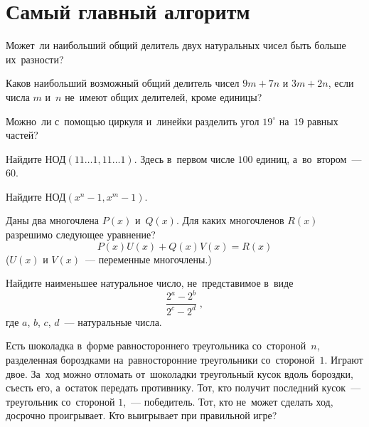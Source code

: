 
\section*{Самый главный алгоритм}


\begin{problems}

\item
Может~ли наибольший общий делитель двух натуральных чисел быть больше
их~разности?

\item
Каков наибольший возможный общий делитель чисел $9 m + 7 n$ и $3 m + 2 n$, если
числа $m$ и~$n$ не~имеют общих делителей, кроме единицы?

\item
Можно~ли с~помощью циркуля и~линейки разделить угол $19^\circ$ на~$19$ равных
частей?

\item
Найдите $\text{НОД}(11\ldots1, 11\ldots1)$.
Здесь в~первом числе $100$ единиц, а~во~втором~--- $60$.

\item
Найдите $\text{НОД}(x^{n} - 1, x^{m} - 1)$.

\item
Даны два многочлена $P(x)$ и~$Q(x)$.
Для каких многочленов $R(x)$ разрешимо следующее уравнение?
\[
    P(x) U(x) + Q(x) V(x) = R(x)
\]
($U(x)$ и $V(x)$~--- переменные многочлены.)

\item
Найдите наименьшее натуральное число, не~представимое в~виде
\[
    \frac{2^a - 2^b}{2^c - 2^d}
\; , \]
где $a$, $b$, $c$, $d$~--- натуральные числа.

\item
Есть шоколадка в~форме равностороннего треугольника со~стороной~$n$,
разделенная бороздками на~равносторонние треугольники со~стороной~$1$.
Играют двое.
За~ход можно отломать от~шоколадки треугольный кусок вдоль бороздки, съесть
его, а~остаток передать противнику.
Тот, кто получит последний кусок~--- треугольник со~стороной $1$,~---
победитель.
Тот, кто не~может сделать ход, досрочно проигрывает.
Кто выигрывает при правильной игре?

\end{problems}

